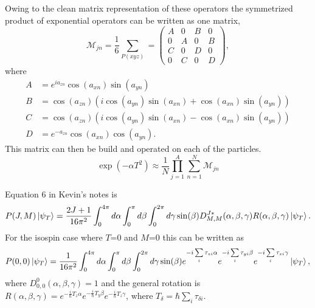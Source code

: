 Owing to the clean matrix representation of these operators the symmetrized product of exponential operators can be written as one matrix,
\begin{equation}
   \mathcal{M}_{jn} = \frac{1}{6} \sum\limits_{P(xyz)} =
\begin{pmatrix}
   A & 0 & B & 0 \\
   0 & A & 0 & B \\
   C & 0 & D & 0 \\
   0 & C & 0 & D
\end{pmatrix},
\end{equation}
where
\begin{align}
   A &= e^{ia_{zn}}\cos(a_{xn})\sin(a_{yn}) \\
   B &= \cos(a_{zn})\left(i\cos(a_{yn})\sin(a_{xn})+\cos(a_{xn})\sin(a_{yn})\right) \\
   C &= \cos(a_{zn})\left(i\cos(a_{yn})\sin(a_{xn})-\cos(a_{xn})\sin(a_{yn})\right) \\
   D &= e^{-a_{zn}}\cos(a_{xn})\cos(a_{yn}).
\end{align}
This matrix can then be build and operated on each of the particles.
\begin{equation} 
   \exp{\left(-\alpha T^2\right)} \approx \frac{1}{N} \prod\limits_{j=1}^A \sum\limits_{n=1}^N \mathcal{M}_{jn}
\end{equation}
\newpage

Equation 6 in Kevin's notes is
\begin{equation}
   P(J,M)\left| \psi_T \right> = \frac{2J+1}{16\pi^2} \int_0^{4\pi} d\alpha \int_0^{\pi} d\beta \int_0^{2\pi} d\gamma \sin(\beta)D^{J*}_{M,M}(\alpha,\beta,\gamma)R(\alpha,\beta,\gamma)\left| \psi_T \right>.
\end{equation}
For the isospin case where $T$=0 and $M$=0 this can be written as
\begin{equation}
   P(0,0)\left| \psi_T \right> = \frac{1}{16\pi^2} \int_0^{4\pi} d\alpha \int_0^{\pi} d\beta \int_0^{2\pi} d\gamma \sin(\beta) e^{-i\sum\limits_i \tau_{zi}\alpha} e^{-i\sum\limits_i \tau_{yi}\beta} e^{-i\sum\limits_i \tau_{zi}\gamma} \left| \psi_T \right>,
\end{equation}
where $D^0_{0,0}(\alpha,\beta,\gamma)=1$ and the general rotation is $R(\alpha,\beta,\gamma)=e^{-\frac{i}{\hbar}T_z\alpha} e^{-\frac{i}{\hbar}T_y\beta} e^{-\frac{i}{\hbar}T_z\gamma}$, where $T_\delta = \hbar\sum\limits_i \tau_{\delta i}$.


